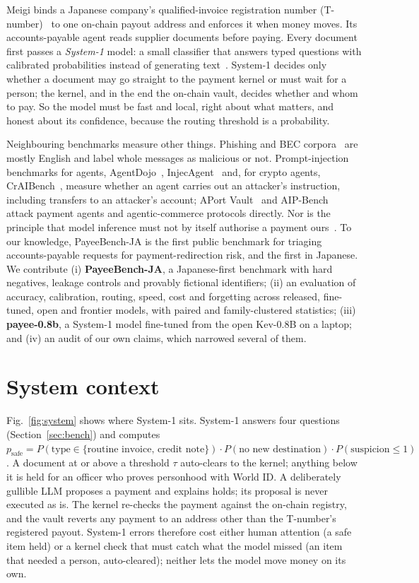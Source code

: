 \documentclass[conference]{IEEEtran}
\begin{document}
Meigi binds a Japanese company's qualified-invoice registration number (T-number)~\cite{nta_invoice} to one on-chain
payout address and enforces it when money moves. Its accounts-payable agent reads supplier documents before paying.
Every document first passes a \emph{System-1} model: a small classifier that answers typed questions with calibrated
probabilities instead of generating text~\cite{typesafe_models,palmer2026kev}. System-1 decides only whether a document
may go straight to the payment kernel or must wait for a person; the kernel, and in the end the on-chain vault, decides
whether and whom to pay. So the model must be fast and local, right about what matters, and honest about its
confidence, because the routing threshold is a probability.

Neighbouring benchmarks measure other things. Phishing and BEC
corpora~\cite{champa2024curated,elaassal2020phishbench} are mostly English and label whole messages as malicious or
not. Prompt-injection benchmarks for agents, AgentDojo~\cite{debenedetti2024agentdojo},
InjecAgent~\cite{zhan2024injecagent} and, for crypto agents, CrAIBench~\cite{patlan2025craibench}, measure whether an
agent carries out an attacker's instruction, including transfers to an attacker's account; APort
Vault~\cite{uchibeke2026aport} and AIP-Bench~\cite{louck2026aipbench} attack payment agents and agentic-commerce
protocols directly. Nor is the principle that model inference must not by itself authorise a payment
ours~\cite{gong2026ais,uchibeke2026aport}. To our knowledge, PayeeBench-JA is the first public benchmark for triaging
accounts-payable requests for payment-redirection risk, and the first in Japanese. We contribute (i) \textbf{PayeeBench-JA}, a Japanese-first
benchmark with hard negatives, leakage controls and provably fictional identifiers; (ii) an evaluation of accuracy,
calibration, routing, speed, cost and forgetting across released, fine-tuned, open and frontier models, with paired and
family-clustered statistics; (iii) \textbf{payee-0.8b}, a System-1 model fine-tuned from the open Kev-0.8B on a laptop;
and (iv) an audit of our own claims, which narrowed several of them.

\section{System context}
Fig.~\ref{fig:system} shows where System-1 sits. System-1 answers four questions (Section~\ref{sec:bench}) and computes
$p_\mathrm{safe} = P(\text{type}\in\{\text{routine invoice, credit note}\})\cdot P(\text{no new destination})\cdot
P(\text{suspicion}\le 1)$. A document at or above a threshold $\tau$ auto-clears to the kernel; anything below it is
held for an officer who proves personhood with World ID. A deliberately gullible LLM proposes a payment and explains
holds; its proposal is never executed as is. The kernel re-checks the payment against the on-chain registry, and the
vault reverts any payment to an address other than the T-number's registered payout. System-1 errors therefore cost
either human attention (a safe item held) or a kernel check that must catch what the model missed (an item that
needed a person, auto-cleared); neither lets the model move money on its own.
\end{document}
